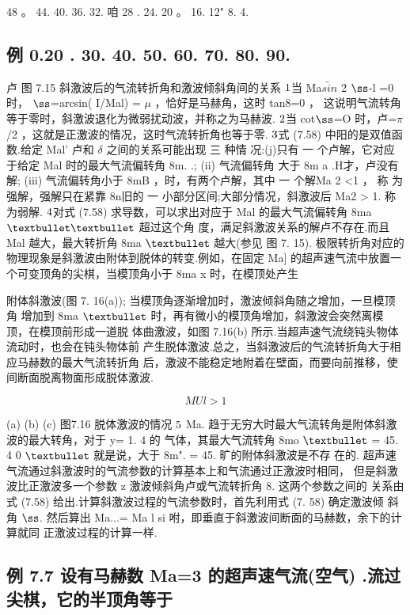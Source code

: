 48 。 44. 40. 36. 32. 咱 28 . 24. 20 。 16. 12" 8. 4.

\subsection*{例 0.20  . 30. 40. 50. 60. 70. 80. 90.}

卢 图 7.15 斜激波后的气流转折角和激波倾斜角间的关系 ${\rm 1}$当 Ma$\tilde{sin}$ 2 ${\rm ß}$-l =0 时， ${\rm ß}$=arcsin( I/Mal) = $\mu$ ，恰好是马赫角，这时 tan8=0 ， 这说明气流转角等于零时，斜激波退化为微弱扰动波，并称之为马赫波. ${\rm 2}$当 cot${\rm ß}$=O 时，卢=$\pi$/2 ，这就是正激波的情况，这时气流转折角也等于零. ${\rm 3}$式 (7.58) 中阳的是双值函数.给定 Mal' 卢和 $\delta$ 之间的关系可能出现 三 种情 况:(j)只有 一 个卢解，它对应于给定 Mal 时的最大气流偏转角 8m. .; (ii) 气流偏转角 大于 8m a .H才，卢没有解; (iii) 气流偏转角小于 8mB ，时，有两个卢解，其中 一 个解Ma 2 <1 ， 称 为强解，强解只在紧靠 8n旧的 一 小部分区间;大部分情况，斜激波后 Ma2 > 1. 称为弱解. ${\rm 4}$对式 (7.58) 求导数，可以求出对应于 Mal 的最大气流偏转角 8ma ${\rm ••}$ 超过这个角 度，满足斜激波关系的解卢不存在.而且 Mal 越大，最大转折角 8ma ${\rm •}$ 越大(参见 图 7. 15). 极限转折角对应的物理现象是斜激波由附体到脱体的转变.例如，在固定 Ma] 的超声速气流中放置一个可变顶角的尖棋，当模顶角小于 8ma x 时，在模顶处产生

附体斜激波(图 7. 16(a)); 当模顶角逐渐增加时，激波倾斜角随之增加，一旦模顶角 增加到 8ma ${\rm •}$ 时，再有微小的模顶角增加，斜激波会突然离模顶，在模顶前形成一道脱 体曲激波，如图 7.16(b) 所示.当超声速气流绕钝头物体流动时，也会在钝头物体前 产生脱体激波.总之，当斜激波后的气流转折角大于相应马赫数的最大气流转折角 后，激波不能稳定地附着在壁面，而要向前推移，使间断面脱离物面形成脱体激波.

\[MUl>1\]

(a) (b) (c) 图7.16 脱体激波的情况 ${\rm 5}$ Ma. 趋于无穷大时最大气流转角是附体斜激波的最大转角，对于 y= 1. 4 的 气体，其最大气流转角 8mo ${\rm •}$ = 45. 4 0 ${\rm •}$ 就是说，大于 8m". = 45. 旷的附体斜激波是不存 在的. 超声速气流通过斜激波时的气流参数的计算基本上和气流通过正激波时相同， 但是斜激波比正激波多一个参数 z 激波倾斜角卢或气流转折角 8. 这两个参数之间的 关系由式 (7.58) 给出.计算斜激波过程的气流参数时，首先利用式 (7. 58) 确定激波倾 斜角 ${\rm ß}$. 然后算出 Ma...= Ma l si 咐，即垂直于斜激波间断面的马赫数，余下的计算就同 正激波过程的计算一样.

\subsection*{例 7.7  设有马赫数 Ma=3 的超声速气流(空气) .流过尖棋，它的半顶角等于}

